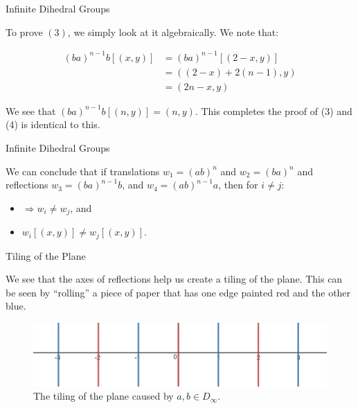 \documentclass[usenames,dvipsnames]{beamer}
\begin{document}
\begin{frame}{Infinite Dihedral Groups}

To prove $(3)$, we simply look at it algebraically. We note that:

\begin{align*}
(ba)^{n-1}b[(x,y)]
&= (ba)^{n-1}[(2-x,y)] \\
&= ((2-x)+2(n-1),y) \\
&= (2n-x,y)
\end{align*}

We see that $(ba)^{n-1}b[(n,y)]=(n,y)$. This completes the proof of (3) and (4) is identical to this.
\end{frame}

\begin{frame}{Infinite Dihedral Groups}

We can conclude that if translations $w_{1}=(ab)^{n}$ and $w_{2}=(ba)^{n}$ and reflections
$w_{3}=(ba)^{n-1}b$, and $w_{4}=(ab)^{n-1}a$, then for $i\neq j$:

\begin{itemize}
  \item $\Rightarrow w_{i}\neq w_{j}$, and
  \item $w_{i}[(x,y)]\neq w_{j}[(x,y)]$.
\end{itemize}

\end{frame}

\begin{frame}{Tiling of the Plane}

We see that the axes of reflections help us create a tiling of the plane. This can be seen by 
``rolling'' a piece of paper that has one edge painted red and the other blue.

\begin{figure}[h]
    \centering
    \includegraphics[width=1\textwidth]{images/2-02-Tiling.png}
    \caption{The tiling of the plane caused by $a,b\in D_\infty$.}
\end{figure}

\end{frame}
\end{document}
